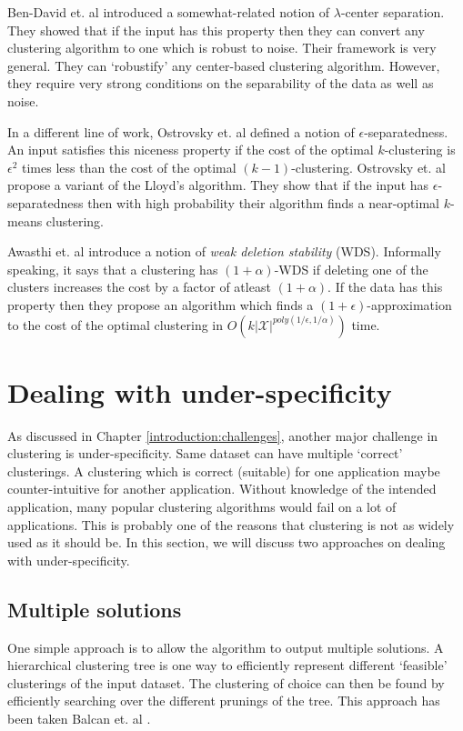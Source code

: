 \documentclass[letterpaper,12pt,titlepage,oneside,final]{book}
\newcommand{\mc}{\mathcal}
\begin{document}
Ben-David et. al \cite{ben2014clustering} introduced a somewhat-related notion of $\lambda$-center separation. They showed that if the input has this property then they can convert any clustering algorithm to one which is robust to noise. Their framework is very general. They can `robustify' any center-based clustering algorithm. However, they require very strong conditions on the separability of the data as well as noise. 

In a different line of work, Ostrovsky et. al \cite{ostrovsky2006effectiveness} defined a notion of $\epsilon$-separatedness. An input satisfies this niceness property if the cost of the optimal $k$-clustering is $\epsilon^2$ times less than the cost of the optimal $(k-1)$-clustering. Ostrovsky et. al \cite{ostrovsky2006effectiveness} propose a variant of the Lloyd's algorithm. They show that if the input has $\epsilon$-separatedness then with high probability their algorithm finds a near-optimal $k$-means clustering.

Awasthi et. al \cite{awasthi2010stability} introduce a notion of \textit{weak deletion stability} (WDS). Informally speaking, it says that a clustering has $(1+\alpha)$-WDS if deleting one of the clusters increases the cost by a factor of atleast $(1+\alpha)$. If the data has this property then they propose an algorithm which finds a $(1+\epsilon)$-approximation to the cost of the optimal clustering in $O(k |\mc X|^{poly(1/\epsilon , 1/\alpha)})$ time. 

\section{Dealing with under-specificity}
As discussed in Chapter \ref{introduction:challenges}, another major challenge in clustering is under-specificity. Same dataset can have multiple `correct' clusterings. A clustering which is correct (suitable) for one application maybe counter-intuitive for another application. Without knowledge of the intended application, many popular clustering algorithms would fail on a lot of applications. This is probably one of the reasons that clustering is not as widely used as it should be.  In this section, we will discuss two approaches on dealing with under-specificity. 

\subsection{Multiple solutions} 
One simple approach is to allow the algorithm to output multiple solutions. A hierarchical clustering tree is one way to efficiently represent different `feasible' clusterings of the input dataset. The clustering of choice can then be found by efficiently searching over the different prunings of the tree. This approach has been taken Balcan et. al \cite{balcan2012clustering}. 
\end{document}
